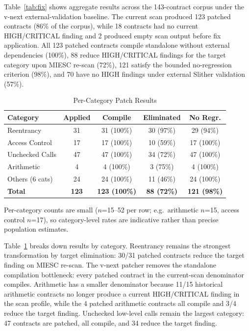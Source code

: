 \documentclass[conference]{IEEEtran}
\begin{document}
Table~\ref{tab:fix} shows aggregate results across the 143-contract corpus under the v-next external-validation baseline. The current scan produced 123 patched contracts (86\% of the corpus), while 18 contracts had no current HIGH/CRITICAL finding and 2 produced empty scan output before fix application. All 123 patched contracts compile standalone without external dependencies (100\%), 88 reduce HIGH/CRITICAL findings for the target category upon MIESC re-scan (72\%), 121 satisfy the bounded no-regression criterion (98\%), and 70 have no HIGH findings under external Slither validation (57\%).

\begin{table}[htbp]
\caption{Per-Category Patch Results}
\label{tab:fix-category}
\centering
\begin{tabular}{@{}lcccc@{}}
\toprule
\textbf{Category} & \textbf{Applied} & \textbf{Compile} & \textbf{Eliminated} & \textbf{No Regr.} \\
\midrule
Reentrancy & 31 & 31 (100\%) & 30 (97\%) & 29 (94\%) \\
Access Control & 17 & 17 (100\%) & 10 (59\%) & 17 (100\%) \\
Unchecked Calls & 47 & 47 (100\%) & 34 (72\%) & 47 (100\%) \\
Arithmetic & 4 & 4 (100\%) & 3 (75\%) & 4 (100\%) \\
Others (6 cats) & 24 & 24 (100\%) & 11 (46\%) & 24 (100\%) \\
\midrule
\textbf{Total} & \textbf{123} & \textbf{123 (100\%)} & \textbf{88 (72\%)} & \textbf{121 (98\%)} \\
\bottomrule
\end{tabular}

\vspace{2pt}
\footnotesize{Per-category counts are small ($n$=15--52 per row; e.g.\ arithmetic $n$=15, access control $n$=17), so category-level rates are indicative rather than precise population estimates.}
\end{table}

Table~\ref{tab:fix-category} breaks down results by category. Reentrancy remains the strongest transformation by target elimination: 30/31 patched contracts reduce the target finding on MIESC re-scan. The v-next patcher removes the standalone compilation bottleneck: every patched contract in the current-scan denominator compiles. Arithmetic has a smaller denominator because 11/15 historical arithmetic contracts no longer produce a current HIGH/CRITICAL finding in the scan profile, while the 4 patched arithmetic contracts all compile and 3/4 reduce the target finding. Unchecked low-level calls remain the largest category: 47 contracts are patched, all compile, and 34 reduce the target finding.
\end{document}

